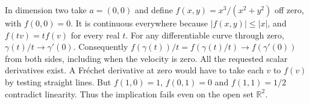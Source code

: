 In dimension two take $a=(0,0)$ and define $f(x,y)=x^3/(x^2+y^2)$ off zero, with $f(0,0)=0$. It is continuous everywhere because $|f(x,y)|\le |x|$, and $f(t v)=t f(v)$ for every real $t$. For any differentiable curve through zero, $\gamma(t)/t\to\gamma'(0)$. Consequently $f(\gamma(t))/t=f(\gamma(t)/t)\to f(\gamma'(0))$ from both sides, including when the velocity is zero. All the requested scalar derivatives exist. A Fréchet derivative at zero would have to take each $v$ to $f(v)$ by testing straight lines. But $f(1,0)=1$, $f(0,1)=0$ and $f(1,1)=1/2$ contradict linearity. Thus the implication fails even on the open set $\mathbb R^2$.
